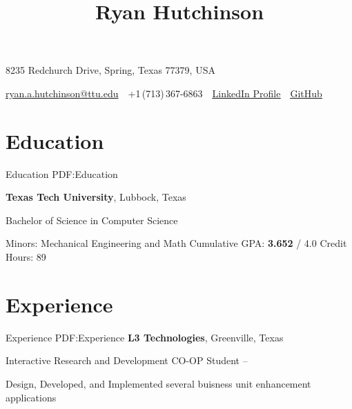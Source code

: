 \documentclass[a4paper,10pt,oneside]{article}
\begin{document}

\title{Ryan Hutchinson}

\begin{subtitle}

{8235 Redchurch Drive, Spring, Texas 77379, USA}
\par
\href{mailto:ryan.a.hutchinson@ttu.edu}
{ryan.a.hutchinson@ttu.edu}
\,\BulletSymbol\,
+1\,(713)\,367-6863
\,\BulletSymbol\,
\href{https://www.linkedin.com/in/ryan-hutchinson-94452a7b}{\underline{LinkedIn Profile}}
\,\BulletSymbol\,
\href{https://github.com/rahutchinson}{\underline{GitHub}}
\end{subtitle}

\begin{body}



\section
{Education}
{Education}
{PDF:Education}


{\textbf{Texas Tech University}},
Lubbock, Texas

\SmallEntryGap
Bachelor of Science in Computer Science
\hfill
\DatestampYMD{}{}{}
\textbf{}
\begin{detail}
\Item
Minors: Mechanical Engineering and Math
\Item
Cumulative GPA: \textbf{3.652} / 4.0
\Item
Credit Hours: 89
\end{detail}




\section
{Experience}
{Experience}
{PDF:Experience}
{\textbf{L3 Technologies}},
Greenville, Texas
\par
\Item
Interactive Research and Development CO-OP Student
\hfill
{} --
\begin{detail}
\BulletItem
Design, Developed, and Implemented several buisness unit enhancement applications
\end{detail}
\SmallEntryGap
\SmallEntryGap


\end{body}
\end{document}
